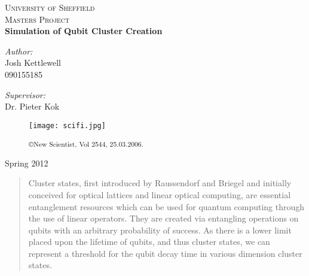 \documentclass{article}
\numberwithin{equation}{section} %
\begin{document}
\begin{center}
\textsc{\LARGE University of Sheffield}\\[1.5cm]
\textsc{\Large Masters Project}\\[0.5cm]
{ \huge \bfseries Simulation of Qubit Cluster Creation }\\

\vspace{1 cm}
\begin{minipage}{0.4\textwidth}
\begin{flushleft} \large
\emph{Author:}\\
Josh Kettlewell\\
090155185
\end{flushleft}
\end{minipage}
\begin{minipage}{0.4\textwidth}
\begin{flushright} \large
\emph{Supervisor:} \\
Dr. Pieter Kok\\
\end{flushright}
\end{minipage}
\vfill


\begin{figure}[h]
\begin{center}
\texttt{[image: scifi.jpg]} \\
\caption{\textsuperscript{\copyright New Scientist, Vol 2544, 25.03.2006.}}
\end{center}
\end{figure}

{\large Spring 2012}
\end{center}


\thispagestyle{empty}
\newpage
\newpage



\setcounter{page}{1}

\begin{abstract}

Cluster states, first introduced by Raussendorf and Briegel\cite{one} and initially conceived for optical lattices and linear optical computing, are essential entanglement resources which can be used for quantum computing through the use of linear operators. They are created via entangling operations on qubits with an arbitrary probability of success. As there is a lower limit placed upon the lifetime of qubits, and thus cluster states, we can represent a threshold for the qubit decay time in various dimension cluster states\cite{one}.

\end{abstract}
\end{document}
